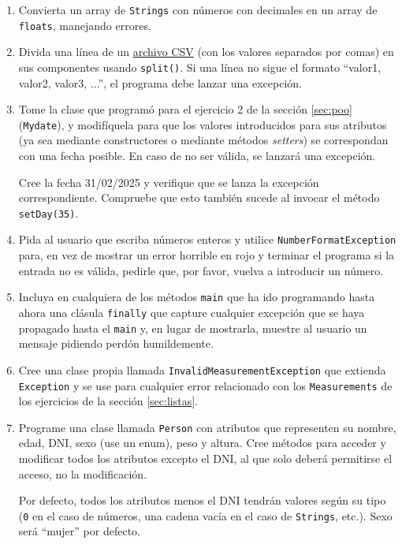\documentclass[a4paper]{article}
\newcommand{\code}[1]{\texttt{#1}}
\begin{document}
\begin{enumerate}

    \item Convierta un array de \code{Strings} con números con decimales en un array de \code{floats}, manejando errores.
    \item Divida una línea de un \href{https://es.wikipedia.org/wiki/Valores_separados_por_comas}{archivo CSV} (con los valores separados por comas) en sus componentes usando \code{split()}. Si una línea no sigue el formato ``valor1, valor2, valor3, ...'', el programa debe lanzar una excepción.
    \item Tome la clase que programó para el ejercicio 2 de la sección \ref{sec:poo} (\code{Mydate}), y modifíquela para que los valores introducidos para sus atributos (ya sea mediante constructores o mediante métodos \textit{setters}) se correspondan con una fecha posible. En caso de no ser válida, se lanzará una excepción.
    
    Cree la fecha 31/02/2025 y verifique que se lanza la excepción correspondiente. Compruebe que esto también sucede al invocar el método \code{setDay(35)}.
    \item Pida al usuario que escriba números enteros y utilice \code{NumberFormatException} para, en vez de mostrar un error horrible en rojo y terminar el programa si la entrada no es válida, pedirle que, por favor, vuelva a introducir un número.
    \item Incluya en cualquiera de los métodos \code{main} que ha ido programando hasta ahora una clásula \code{finally} que capture cualquier excepción que se haya propagado hasta el \code{main} y, en lugar de mostrarla, muestre al usuario un mensaje pidiendo perdón humildemente.
    \item Cree una clase propia llamada \code{InvalidMeasurementException} que extienda \code{Exception} y se use para cualquier error relacionado con los \code{Measurements} de los ejercicios de la sección \ref{sec:listas}.

    \item Programe una clase llamada \code{Person} con atributos que representen su nombre, edad, DNI, sexo (use un enum), peso y altura. Cree métodos para acceder y modificar todos los atributos excepto el DNI, al que solo deberá permitirse el acceso, no la modificación.
    
    Por defecto, todos los atributos menos el DNI tendrán valores según su tipo (\code{0} en el caso de números, una cadena vacía en el caso de \code{Strings}, etc.). Sexo será ``mujer'' por defecto.
    

\end{enumerate}
\end{document}
